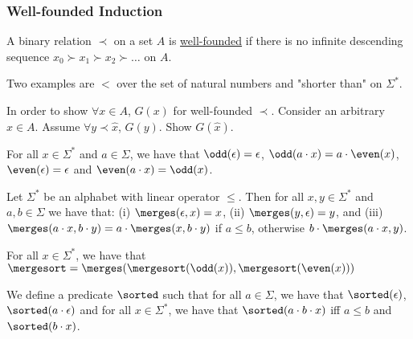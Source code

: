 \subsubsection{Well-founded Induction}

\begin{definition} A binary relation $\prec$ on a set $A$ is  \underline{well-founded} if there is no infinite descending sequence $x_0 \succ x_1 \succ x_2 \succ \ldots$ on $A$.
\end{definition}

\begin{example} Two examples are $<$ over the set of natural numbers and "shorter than" on $\Sigma^*$.
\end{example}


\begin{remark}
 In order to show $\forall x\in A$, $G(x)$ for well-founded $\prec$. Consider an arbitrary $\hat{x} \in A$.
Assume $\forall y \prec \hat{x}$, $G(y)$.
Show $G(\hat{x})$.
\end{remark}

\begin{definition} For all $x \in \Sigma^*$ and $a \in \Sigma$, we have that $\odd(\epsilon) = \epsilon$, $\odd(a\cdot x) = a\cdot \even(x)$, $\even(\epsilon) = \epsilon$ and $\even(a\cdot x) = \odd(x)$.
\end{definition}


\begin{definition}[$\merges$] Let $\Sigma^*$ be an alphabet with linear operator $\leq$. Then for all $x,y \in \Sigma^*$ and $a,b \in \Sigma$ we have that: (i) $\merges(\epsilon, x) = x$, (ii) $\merges(y, \epsilon) = y$, and (iii) $\merges(a\cdot x, b\cdot y) = a\cdot \merges(x, b\cdot y)$ if $a \leq b$, otherwise $b\cdot \merges(a\cdot x, y)$.
\end{definition}

\begin{definition}[$\mergesort$] For all $x \in \Sigma^*$, we have that $\mergesort = \merges(\mergesort(\odd(x)), \mergesort(\even(x)))$
\end{definition}

\begin{definition}[$\sorted$] We define a predicate $\sorted$ such that for all $a \in \Sigma$, we have that $\sorted(\epsilon)$, $\sorted(a\cdot\epsilon)$ and for all $x\in \Sigma^*$, we have that $\sorted(a\cdot b\cdot x)$ iff $a\leq b$ and $\sorted(b\cdot x)$.
\end{definition}

